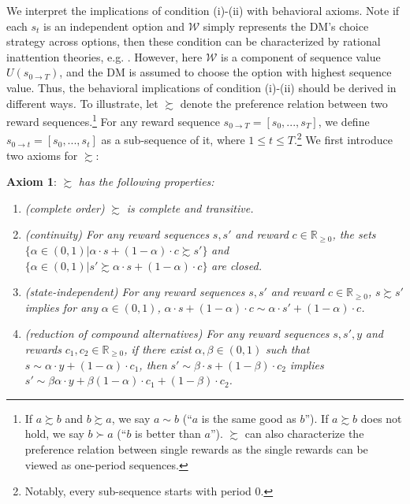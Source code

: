 \documentclass[
  12pt,
]{article}
\begin{document}
We interpret the implications of condition (i)-(ii) with behavioral
axioms. Note if each \(s_t\) is an independent option and
\(\mathcal{W}\) simply represents the DM's choice strategy across
options, then these condition can be characterized by rational
inattention theories, e.g. \citet{caplin2022rationally}. However, here
\(\mathcal{W}\) is a component of sequence value
\(U(s_{0\rightarrow T})\), and the DM is assumed to choose the option
with highest sequence value. Thus, the behavioral implications of
condition (i)-(ii) should be derived in different ways\emph{.} To
illustrate, let \(\succsim\) denote the preference relation between two
reward sequences.\footnote{If \(a \succsim b\) and \(b\succsim a\), we
  say \(a\sim b\) (``\(a\) is the same good as \(b\)''). If
  \(a \succsim b\) does not hold, we say \(b\succ a\) (``\(b\) is better
  than \(a\)''). \(\succsim\) can also characterize the preference
  relation between single rewards as the single rewards can be viewed as
  one-period sequences.} For any reward sequence
\(s_{0\rightarrow T}=[s_0,...,s_T]\), we define
\(s_{0\rightarrow t}=[s_0,...,s_t]\) as a sub-sequence of it, where
\(1\leq t\leq T\).\footnote{Notably, every sub-sequence starts with
  period 0.} We first introduce two axioms for \(\succsim\):

\noindent \textbf{Axiom 1}: \(\succsim\) \emph{has the following
properties:}

\begin{enumerate}
\def\labelenumi{(\alph{enumi})}
\item
  \emph{(complete order)} \(\succsim\) \emph{is complete and
  transitive.}
\item
  \emph{(continuity) For any reward sequences} \(s,s'\) \emph{and
  reward} \(c\in \mathbb{R}_{\geq 0}\)\emph{, the sets}
  \(\{\alpha \in(0,1) | \alpha\cdot s + (1-\alpha)\cdot c \succsim s'\}\)
  \emph{and}
  \(\{\alpha \in(0,1) | s' \succsim \alpha\cdot s + (1-\alpha)\cdot c \}\)
  \emph{are closed.}
\item
  \emph{(state-independent) For any reward sequences} \(s,s'\) \emph{and
  reward} \(c\in \mathbb{R}_{\geq 0}\)\emph{,} \(s \succsim s'\)
  \emph{implies for any} \(\alpha \in (0,1)\)\emph{,}
  \(\alpha\cdot s + (1-\alpha)\cdot c \sim \alpha \cdot s' + (1-\alpha) \cdot c\)\emph{.}
\item
  \emph{(reduction of compound alternatives) For any reward sequences}
  \(s,s',y\) \emph{and rewards}
  \(c_1,c_2\in \mathbb{R}_{\geq 0}\)\emph{, if there exist}
  \(\alpha, \beta \in (0,1)\) \emph{such that}
  \(s \sim \alpha \cdot y + (1-\alpha) \cdot c_1\)\emph{, then}
  \(s' \sim \beta \cdot s + (1-\beta)\cdot c_2\) \emph{implies}
  \(s' \sim \beta\alpha\cdot y+\beta(1-\alpha)\cdot c_1 + (1-\beta)\cdot c_2\)\emph{.}
\end{enumerate}
\end{document}
